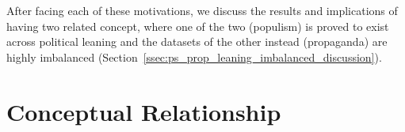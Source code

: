 
After facing each of these motivations, we discuss the results and implications of having two related concept, where one of the two (populism) is proved to exist across political leaning and the datasets of the other instead (propaganda) are highly imbalanced (Section~\ref{ssec:ps_prop_leaning_imbalanced_discussion}).

\section{\statusgreen Conceptual Relationship}
\label{ssec:ps_prop_leaning_imbalanced_concepts_populism_propaganda}

